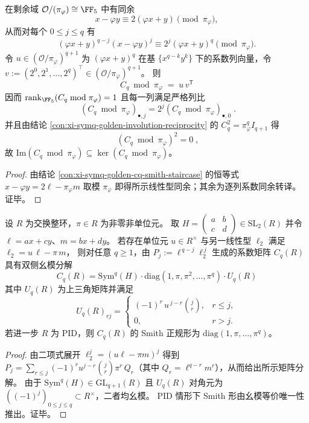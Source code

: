 \begin{corollary}\label{cor:xi-symq-golden-cq-mod-pi-rankone-outer}
在剩余域 \(\mathcal O/(\pi_\varphi)\cong\FF_5\) 中有同余
\[
x-\varphi y\equiv 2(\varphi x+y)\pmod{\pi_\varphi},
\]
从而对每个 \(0\le j\le q\) 有
\[
(\varphi x+y)^{q-j}(x-\varphi y)^j\equiv 2^{j}(\varphi x+y)^q\pmod{\pi_\varphi}.
\]
令 \(u\in(\mathcal O/\pi_\varphi)^{q+1}\) 为 \((\varphi x+y)^q\) 在基 \(\{x^{q-k}y^k\}\) 下的系数列向量，令
\(
v:=(2^{0},2^{1},\dots,2^{q})^{\top}\in(\mathcal O/\pi_\varphi)^{q+1}
\)。
则
\[
\boxed{\;
C_q\bmod \pi_\varphi\;=\;u\,v^{\mathsf T}\;}
\]
因而 \(\mathrm{rank}_{\FF_5}(C_q\bmod \pi_\varphi)=1\) 且每一列满足严格列比
\[
\boxed{\;
(C_q\bmod \pi_\varphi)_{\bullet,j}=2^{j}(C_q\bmod \pi_\varphi)_{\bullet,0}\; }.
\]
并且由结论 \ref{con:xi-symq-golden-involution-reciprocity} 的 \(C_q^2=\pi_\varphi^q I_{q+1}\) 得
\[
\boxed{\;(C_q\bmod \pi_\varphi)^2=0\;},
\]
故 \(\mathrm{Im}(C_q\bmod \pi_\varphi)\subseteq \ker(C_q\bmod \pi_\varphi)\)。
\end{corollary}
\begin{proof}
由结论 \ref{con:xi-symq-golden-cq-smith-staircase} 的恒等式 \(x-\varphi y=2\ell-\pi_\varphi m\) 取模 \(\pi_\varphi\) 即得所示线性型同余；其余为逐列系数同余转译。证毕。
\end{proof}

\begin{proposition}\label{prop:xi-smith-staircase-template-symq}
设 \(R\) 为交换整环，\(\pi\in R\) 为非零非单位元。
取
\(
H=\begin{pmatrix}a&b\\ c&d\end{pmatrix}\in\mathrm{SL}_2(R)
\)
并令 \(\ell=ax+cy\)、\(m=bx+dy\)。
若存在单位元 \(u\in R^\times\) 与另一线性型 \(\ell_2\) 满足
\(
\ell_2=u\,\ell-\pi\,m
\)，
则对任意 \(q\ge 1\)，由
\(
P_j:=\ell^{\,q-j}\ell_2^{\,j}
\)
生成的系数矩阵 \(C_q(R)\) 具有双侧幺模分解
\[
\boxed{\;
C_q(R)=\mathrm{Sym}^q(H)\cdot \mathrm{diag}(1,\pi,\pi^2,\dots,\pi^q)\cdot U_q(R)\;}
\]
其中 \(U_q(R)\) 为上三角矩阵并满足
\[
U_q(R)_{rj}=
\begin{cases}
(-1)^r\,u^{\,j-r}\binom{j}{r},& r\le j,\\
0,& r>j.
\end{cases}
\]
若进一步 \(R\) 为 PID，则 \(C_q(R)\) 的 Smith 正规形为 \(\mathrm{diag}(1,\pi,\dots,\pi^q)\)。
\end{proposition}
\begin{proof}
由二项式展开
\(
\ell_2^{j}=(u\ell-\pi m)^{j}
\)
得到 \(P_j=\sum_{r\le j}(-1)^r u^{j-r}\binom{j}{r}\pi^r\,Q_r\)（其中 \(Q_r=\ell^{q-r}m^r\)），从而给出所示矩阵分解。
由于 \(\mathrm{Sym}^q(H)\in\mathrm{GL}_{q+1}(R)\) 且 \(U_q(R)\) 对角元为 \(((-1)^j)_{0\le j\le q}\subset R^\times\)，二者均幺模。
PID 情形下 Smith 形由幺模等价唯一性推出。证毕。
\end{proof}



\endinput

